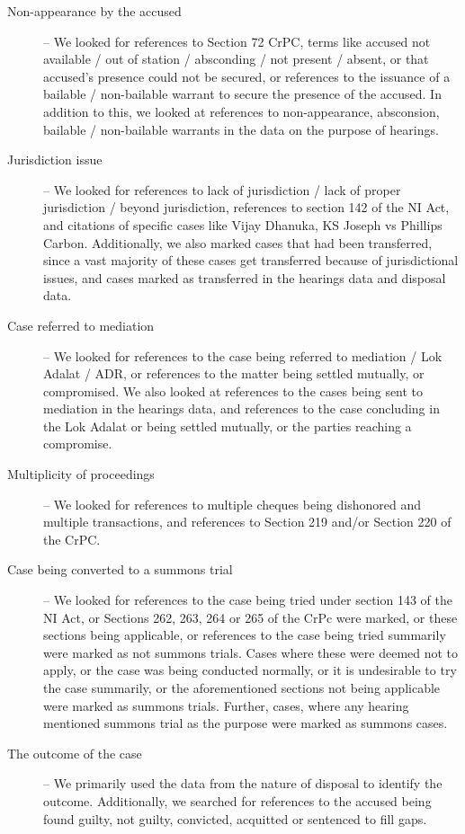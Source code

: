 \begin{description}
\item [Non-appearance by the accused] -- We looked for references to Section 72
  CrPC, terms like accused not available / out of station / absconding
  / not present / absent, or that accused’s presence could not be
  secured, or references to the issuance of a bailable / non-bailable
  warrant to secure the presence of the accused. In addition to this,
  we looked at references to non-appearance, absconsion, bailable /
  non-bailable warrants in the data on the purpose of hearings.
\item [Jurisdiction issue] -- We looked for references to lack of
  jurisdiction / lack of proper jurisdiction / beyond jurisdiction,
  references to section 142 of the NI Act, and citations of specific
  cases like Vijay Dhanuka, KS Joseph vs Phillips
  Carbon. Additionally, we also marked cases that had been
  transferred, since a vast majority of these cases get transferred
  because of jurisdictional issues, and cases marked as transferred in
  the hearings data and disposal data.
\item [Case referred to mediation] -- We looked for references to the case being
  referred to mediation / Lok Adalat / ADR, or references to the
  matter being settled mutually, or compromised. We also looked at
  references to the cases being sent to mediation in the hearings
  data, and references to the case concluding in the Lok Adalat or
  being settled mutually, or the parties reaching a compromise.
\item [Multiplicity of proceedings] -- We looked for references to multiple cheques being dishonored and multiple transactions, and references to Section 219 and/or Section 220 of the CrPC.
\item [Case being converted to a summons trial] -- We looked for references to the case being
  tried under section 143 of the NI Act, or Sections 262, 263, 264 or
  265 of the CrPc were marked, or these sections being applicable, or
  references to the case being tried summarily were marked as not
  summons trials. Cases where these were deemed not to apply, or
  the case was being conducted normally, or it is undesirable to try
  the case summarily, or the aforementioned sections not being
  applicable were marked as summons trials. Further, cases, where any hearing mentioned summons trial as the purpose were marked as summons cases.
\item [The outcome of the case] -- We primarily used the data from the nature of
  disposal to identify the outcome. Additionally, we searched for
  references to the accused being found guilty, not guilty, convicted,
  acquitted or sentenced to fill gaps.
\end{description}

